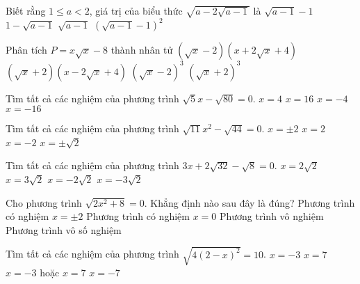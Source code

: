    
   \begin{bt} Biết rằng $1\leq a<2$, giá trị của biểu thức $\sqrt{a-2\sqrt{a-1}}$ là
   	\choice
   	{$\sqrt{a-1}-1$}
   	{\True $1-\sqrt{a-1}$}
   	{$\sqrt{a-1}$}
   	{$(\sqrt{a-1}-1)^2$}
   \end{bt}
   \begin{bt}
   	Phân tích $P=x\sqrt{x}-8$ thành nhân tử
   	\choice
   	{\True $(\sqrt{x}-2)(x+2\sqrt{x}+4)$}	
   	{$(\sqrt{x}+2)(x-2\sqrt{x}+4)$}
   	{$(\sqrt{x}-2)^3$}
   	{$(\sqrt{x}+2)^3$}
   \end{bt}
 \begin{bt}%
	Tìm tất cả các nghiệm của phương trình $\sqrt{5}x-\sqrt{80}=0$.
	\choice
	{\True $x=4$}
	{$x=16$}
	{$x=-4$}
	{$x=-16$}
\end{bt} 
\begin{bt}%
	Tìm tất cả các nghiệm của phương trình $\sqrt{11}x^2-\sqrt{44}=0$.
	\choice
	{$x=\pm 2$}
	{$x=2$}
	{$x=-2$}
	{\True $x=\pm \sqrt{2}$}
\end{bt} 
\begin{bt}%
	Tìm tất cả các nghiệm của phương trình $3x+2\sqrt{32}-\sqrt{8}=0$.
	\choice
	{$x=2\sqrt{2}$}
	{$x=3\sqrt{2}$}
	{\True $x=-2\sqrt{2}$}
	{$x=-3\sqrt{2}$}
\end{bt} 
\begin{bt}%
	Cho phương trình $\sqrt{2x^2+8}=0$. Khẳng định nào sau đây là đúng?
	\choice
	{Phương trình có nghiệm $x=\pm 2$}
	{Phương trình có nghiệm $x=0$}
	{\True Phương trình vô nghiệm}
	{Phương trình vô số nghiệm}
\end{bt} 
\begin{bt}%
	Tìm tất cả các nghiệm của phương trình $\sqrt{4(2-x)^2}=10$.
	\choice
	{$x=-3$}
	{$x=7$}
	{$x=-3$ hoặc $x=7$}
	{$x=-7$}
\end{bt} 
